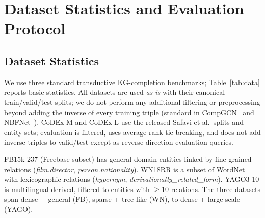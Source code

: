 \section{Dataset Statistics and Evaluation Protocol}
\label{app:data}

\subsection{Dataset Statistics}
We use three standard transductive KG-completion benchmarks; Table~\ref{tab:data} reports basic statistics.
All datasets are used \emph{as-is} with their canonical train/valid/test splits; we do not perform any additional filtering or preprocessing beyond adding the inverse of every training triple (standard in CompGCN~\citep{compgcn} and NBFNet~\citep{nbfnet}). CoDEx-M and CoDEx-L use the released Safavi et al.\ splits and entity sets; evaluation is filtered, uses average-rank tie-breaking, and does not add inverse triples to valid/test except as reverse-direction evaluation queries.

\begin{table}[!htb]
\centering
\caption{Dataset statistics. Inverse triples are added at training time and account for the doubled relation count during message passing.}
\label{tab:data}
\footnotesize
\setlength{\tabcolsep}{3pt}
\end{table}

FB15k-237 (Freebase subset) has general-domain entities linked by fine-grained relations (\eg \emph{film.director}, \emph{person.nationality}).
WN18RR is a subset of WordNet with lexicographic relations (\emph{hypernym}, \emph{derivationally\_related\_form}).
YAGO3-10 is multilingual-derived, filtered to entities with $\ge 10$ relations.
The three datasets span dense + general (FB), sparse + tree-like (WN), to dense + large-scale (YAGO).

